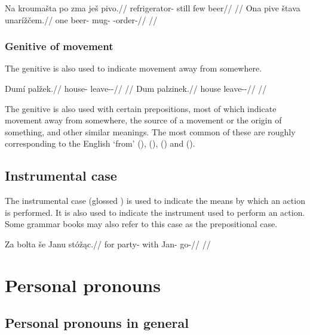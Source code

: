 \pex
\a
\begingl
\gla Na kroumašta po zma ješ pivo.//
\glb \Loc{} refrigerator-\Acc{} still few \Exst{} beer//
\glft {}//
\endgl
\a
\begingl
\gla Ona pive štava unarížčem.//
\glb one beer-\Gen{} mug-\Acc{} \Refl{}-order-//
\glft {}//
\endgl
\xe

\subsubsection{Genitive of movement}

The genitive is also used to indicate movement away from somewhere.

\pex
\a
\begingl
\gla Dumí palžek.//
\glb house-\Gen{} leave-\Av{}-\Pf{}//
\glft {}//
\endgl
\a
\begingl
\gla Dum palzinek.//
\glb house leave-\Pv{}-\Pf{}//
\glft {}//
\endgl
\xe

The genitive is also used with certain prepositions, most of which indicate movement away from somewhere, the source of a movement or the origin of something, and other similar meanings. The most common of these are  roughly corresponding to the English `from' (),  (),  () and  ().

\subsection{Instrumental case}

The instrumental case (glossed \Ins{}) is used to indicate the means by which an action is performed. It is also used to indicate the instrument used to perform an action. Some grammar books may also refer to this case as the prepositional case.

\pex
\begingl
\gla Za bolta še Janu stóž\k{a}c.//
\glb for party-\Acc{} with Jan-\Ins{} go-//
\glft {}//
\endgl
\xe

\section{Personal pronouns}

\subsection{Personal pronouns in general}

